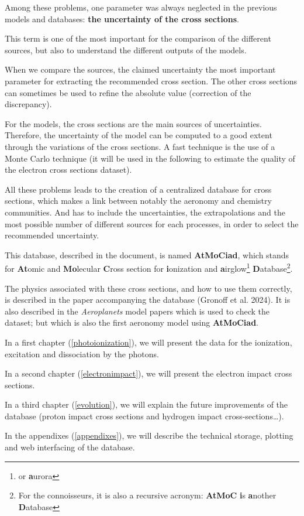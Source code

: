 Among these problems, one parameter was always neglected in the previous models and databases: \textbf{the uncertainty of the cross sections}.

This term is one of the most important for the comparison of the different sources, but also to understand the different outputs of the models.

When we compare the sources, the claimed uncertainty the most important parameter for extracting the recommended cross section. The other cross sections can sometimes be used to refine the absolute value (correction of the discrepancy).

For the models, the cross sections are the main sources of uncertainties. Therefore, the uncertainty of the model can be computed to a good extent through the variations of the cross sections. A fast technique is the use of a Monte Carlo technique (it will be used in the following to estimate the quality of the electron cross sections dataset).


All these problems leads to the creation of a centralized database for cross sections, which makes a link between notably the aeronomy and chemistry communities. And has to include  the uncertainties,  the extrapolations and the most possible number of different sources for each processes, in order to select the recommended uncertainty.

This database, described in the document, is named \textbf{AtMoCiad}, which stands for \textbf{At}omic and \textbf{Mo}lecular \textbf{C}ross section for \textbf{i}onization and \textbf{a}irglow\footnote{or \textbf{a}urora} \textbf{D}atabase\footnote{For the connoisseurs, it is also a recursive acronym: \textbf{AtMoC} \textbf{i}s \textbf{a}nother \textbf{D}atabase}.



The physics associated with these cross sections, and how to use them correctly, is described in the paper accompanying the database (Gronoff et al. 2024). It is also described in the \textit{Aeroplanets} model papers \cite{Gronoff2012,Gronoff2012b} which is used to check the dataset; but which is also the first aeronomy model using \textbf{AtMoCiad}.

In a first chapter (\ref{photoionization}), we will present the data for the ionization, excitation and dissociation by the photons.

In a second chapter (\ref{electronimpact}), we will present the electron impact cross sections.

In a third chapter (\ref{evolution}), we will explain the future improvements of the database (proton impact cross sections and hydrogen impact cross-sections\ldots).


In the appendixes (\ref{appendixes}), we will describe the technical storage, plotting and web interfacing of the database.




